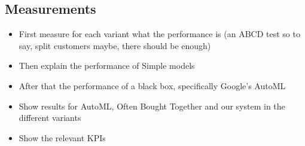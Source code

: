 \subsection{Measurements}
\begin{itemize}
    \item First measure for each variant what the performance is (an ABCD test so to say, split customers maybe, there should be enough)
    \item Then explain the performance of Simple models
    \item After that the performance of a black box, specifically Google's AutoML
    \item Show results for AutoML, Often Bought Together and our system in the different variants
    \item Show the relevant KPIs
\end{itemize}